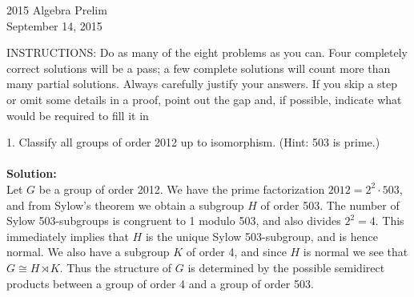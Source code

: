 \documentclass[11pt]{article}
\begin{document}
\begin{center}
\Large 2015 Algebra Prelim\\
\normalsize September 14, 2015
\end{center}
\vspace{1em}

INSTRUCTIONS: Do as many of the eight problems as you can. Four completely
correct solutions will be a pass; a few complete solutions will count more than many
partial solutions. Always carefully justify your answers. If you skip a step or omit
some details in a proof, point out the gap and, if possible, indicate what would be
required to fill it in\\
\vspace{1em}

1. Classify all groups of order 2012 up to isomorphism. (Hint: 503 is prime.)\\
\\\textbf{Solution:}\\
Let $G$ be a group of order 2012. We have the prime factorization $2012 = 2^2\cdot 503$, and from Sylow's theorem we obtain a subgroup $H$ of order 503. The number of Sylow 503-subgroups is congruent to 1 modulo 503, and also divides $2^2=4$. This immediately implies that $H$ is the unique Sylow 503-subgroup, and is hence normal. We also have a subgroup $K$ of order 4, and since $H$ is normal we see that $G \cong H\rtimes K$. Thus the structure of $G$ is determined by the possible semidirect products between a group of order 4 and a group of order 503. 
\end{document}
